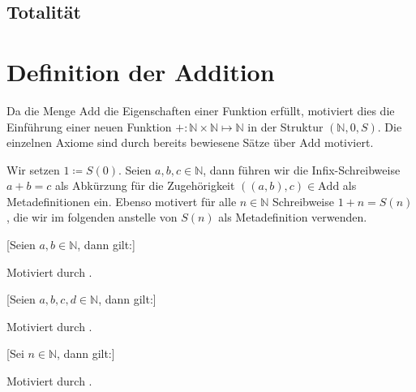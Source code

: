 \documentclass[main.tex]{subfiles}
\begin{document}
\subsection{Totalität}


\section{Definition der Addition}

\begin{definition}
Da die Menge \(\mathrm{Add}\) die Eigenschaften einer Funktion erfüllt, motiviert dies die Einführung einer neuen Funktion \(+:\mathbb{N}\times\mathbb{N}\mapsto \mathbb{N}\) in der Struktur
\((\mathbb{N},0,S)\). Die einzelnen Axiome sind durch bereits bewiesene Sätze
über \(\mathrm{Add}\) motiviert.
\end{definition}
\begin{remark}
Wir setzen \(1 \coloneqq S(0)\). Seien \(a,b,c\in\mathbb{N}\), dann  führen wir die Infix-Schreibweise \(a+b=c\) als Abkürzung für die Zugehörigkeit \(((a,b),c)\in \mathrm{Add}\) als Metadefinitionen ein. Ebenso motivert  für alle \(n\in\mathbb{N}\) Schreibweise \(1+n=S(n)\), die wir im folgenden anstelle von \(S(n)\) als Metadefinition verwenden.
\end{remark}


[Seien \(a,b\in\mathbb{N}\), dann gilt:]
\begin{remark}
Motiviert durch .
\end{remark}

[Seien \(a,b,c,d\in\mathbb{N}\), dann gilt:]
\begin{remark}
Motiviert durch .
\end{remark}

[Sei \(n\in\mathbb{N}\), dann gilt:]
\begin{remark}
Motiviert durch .
\end{remark}
\end{document}
